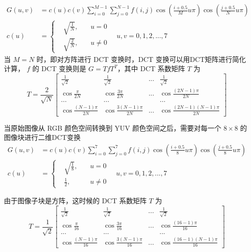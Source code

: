 \begin{equation}
    \begin{aligned}
        G(u,v) &=c(u)c(v) \sum_{i=0}^{M-1} \sum_{j=0}^{N-1} f(i,j) \cos(\frac{i+0.5}{M}u\pi) \cos(\frac{j+0.5}{N}u\pi) \\
        c(u) &=\left\{\begin{aligned}
            & \sqrt{\frac{1}{N}}, & \quad u=0 \\
            & \sqrt{\frac{2}{N}}, & \quad u\neq 0
        \end{aligned}\right.
        \quad u,v=0,1,2,...,7
    \end{aligned}
    \label{Eq.DCT}
\end{equation}
当 $M=N$ 时，即对方阵进行 DCT 变换时，DCT 变换可以用DCT矩阵进行简化计算， $f$ 的 DCT 变换则是 $G=TfT^T$，其中 DCT 系数矩阵 $T$ 为
\begin{equation}
    T=\frac{2}{\sqrt{N}}
    \begin{bmatrix}
        \frac{1}{\sqrt{2}}      & \frac{1}{\sqrt{2}}        & ...   & \frac{1}{\sqrt{2}} \\
        \cos\frac{\pi}{2N}      & \cos\frac{3\pi}{2N}       & ...   & \cos\frac{(2N-1)\pi}{2N} \\
        ...                     & ...                       &       & ... \\
        \cos\frac{(N-1)\pi}{2N} & \cos\frac{3(N-1)\pi}{2N}  & ...   & \cos\frac{(2N-1)(N-1)\pi}{2N}
    \end{bmatrix}
\end{equation}


当原始图像从 RGB 颜色空间转换到 YUV 颜色空间之后，需要对每一个 $8 \times 8$ 的图像块进行二维DCT变换
\begin{equation}
    \begin{aligned}
        G(u,v) &=c(u)c(v) \sum_{i=0}^{7} \sum_{j=0}^{7} f(i,j) \cos(\frac{i+0.5}{8}u\pi) \cos(\frac{j+0.5}{8}u\pi) \\
        c(u) &=\left\{\begin{aligned}
            & \sqrt{\frac{1}{8}},   & \quad u=0 \\
            & \frac{1}{2},          & \quad u\neq 0
        \end{aligned}\right.
        \quad u,v=0,1,2,...,7
    \end{aligned}
    \label{Eq.DCT8_8}
\end{equation}

由于图像子块是方阵，这时候的 DCT 系数矩阵 $T$ 为
\begin{equation}
    T=\frac{1}{\sqrt{2}}
    \begin{bmatrix}
        \frac{1}{\sqrt{2}}      & \frac{1}{\sqrt{2}}        & ...   & \frac{1}{\sqrt{2}} \\
        \cos\frac{\pi}{16}      & \cos\frac{3\pi}{16}       & ...   & \cos\frac{(16-1)\pi}{16} \\
        ...                     & ...                       &       & ... \\
        \cos\frac{(N-1)\pi}{16} & \cos\frac{3(N-1)\pi}{16}  & ...   & \cos\frac{(16-1)(N-1)\pi}{16}
    \end{bmatrix}
    \label{Eq.DCT-coefficient_matrix}
\end{equation}

